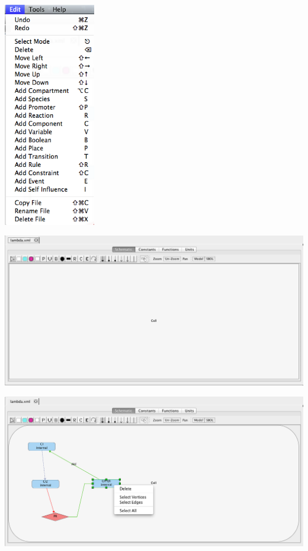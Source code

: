 \documentclass[titlepage,11pt]{article}
\begin{document}
\begin{center}
\includegraphics[width=40mm]{screenshots/editMenu}
\end{center}

\begin{center}
\includegraphics[width=160mm]{screenshots/ModelEditor}
\end{center}

\begin{center}
\includegraphics[width=160mm]{screenshots/deleteSelect}
\end{center}
\end{document}
